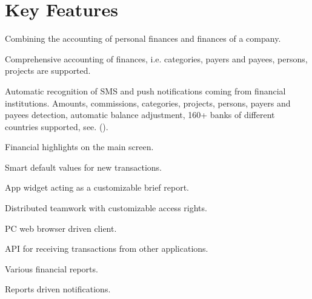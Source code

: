 \documentclass[a4paper,10pt,english]{sphinxmanual}
\begin{document}
\noindent{}

\noindent{}

\noindent{}


\section{Key Features}
\label{\detokenize{about:key-features}}
\sphinxAtStartPar
Combining the accounting of personal finances and finances of a company.

\sphinxAtStartPar
Comprehensive accounting of finances, i.e. categories, payers and payees, persons, projects are supported.

\sphinxAtStartPar
Automatic recognition of SMS and push notifications coming from financial institutions. Amounts, commissions, categories, projects, persons,
payers and payees detection, automatic balance adjustment, 160+ banks of different countries supported,
see. {\hyperref[\detokenize{banks:chapter-supported-banks}]{}} ().

\sphinxAtStartPar
Financial highlights on the main screen.

\sphinxAtStartPar
Smart default values for new transactions.

\sphinxAtStartPar
App widget acting as a customizable brief report.

\sphinxAtStartPar
Distributed teamwork with customizable access rights.

\sphinxAtStartPar
PC web browser driven client.

\sphinxAtStartPar
API for receiving transactions from other applications.

\sphinxAtStartPar
Various financial reports.

\sphinxAtStartPar
Reports driven notifications.
\end{document}
